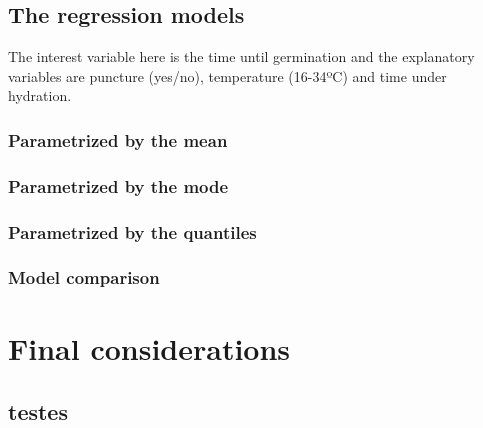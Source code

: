 \documentclass[12pt]{article}%
\numberwithin{equation}{section} %
\begin{document}
\subsection{The regression models}

The interest variable here is the time until germination and the explanatory variables are puncture (yes/no), temperature (16-34ºC) and time under hydration.

\subsubsection{Parametrized by the mean} 

\subsubsection{Parametrized by the mode}

\subsubsection{Parametrized by the quantiles}

\subsubsection{Model comparison}

\section{Final considerations}

\newpage

\subsection{testes}
\end{document}
